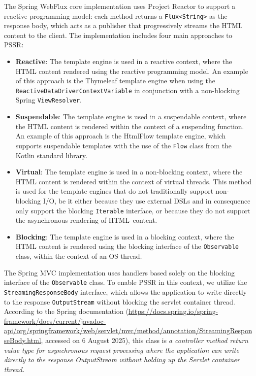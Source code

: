 \documentclass[software,article,accept,pdftex,moreauthors]{Definitions/mdpi}
\begin{document}
The Spring WebFlux core implementation uses Project Reactor to support a
reactive programming model: each method returns a \texttt{Flux<String>} as the
response body, which acts as a publisher that progressively streams the HTML
content to the client. The implementation includes four main approaches to
PSSR\@:
\begin{itemize}
      \item \textbf{Reactive}: The template engine is used in a reactive context,
            where the HTML content rendered using the reactive programming model.
            An example of this approach is the Thymeleaf template engine
            when using the \texttt{ReactiveDataDriverContextVariable} in conjunction with a
            non-blocking Spring \texttt{ViewResolver}.
      \item \textbf{Suspendable}: The template engine is used in a suspendable
            context, where the HTML content is rendered within the context of a suspending function.
            An example of this approach is the HtmlFlow template engine, which
            supports suspendable templates with the use of the \texttt{Flow} class from the
            Kotlin standard library.
      \item \textbf{Virtual}: The template engine is used in a non-blocking
            context, where the HTML content is rendered within the context of virtual
            threads. This method is used for the template engines that do not traditionally
            support non-blocking I/O, be it either because they use external DSLs and in
            consequence only support the blocking \texttt{Iterable} interface, or
            because they do not support the asynchronous rendering of HTML~content.
      \item \textbf{Blocking}: The template engine is used in a blocking
            context, where the HTML content is rendered using the blocking interface of the
            \texttt{Observable} class, within the context of an OS-thread.
\end{itemize}

The Spring MVC implementation uses handlers based solely on the blocking
interface of the \texttt{Observable} class. To enable PSSR in this context, we
utilize the \texttt{StreamingResponseBody} interface, which allows the
application to write directly to the response \texttt{OutputStream} without
blocking the servlet container thread. According to the Spring documentation ({\url{https://docs.spring.io/spring-framework/docs/current/javadoc-api/org/springframework/web/servlet/mvc/method/annotation/StreamingResponseBody.html}}, accessed on 6 August 2025),
this class is \textit{a controller method return value type for asynchronous
request processing where the application can write directly to the response
OutputStream without holding up the Servlet container thread.}
\end{document}
